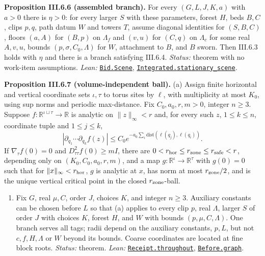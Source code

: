 \documentclass[
  letterpaper,
  11pt]{article}
\providecommand{\tightlist}{%
  \setlength{\itemsep}{0pt}\setlength{\parskip}{0pt}}
\begin{document}
\textbf{Proposition III.6.6 (assembled branch).} For every
\((G,L,J,K,a)\) with \(a>0\) there is \(\eta>0\): for every larger \(S\)
with these parameters, forest \(H\), beds \(B,C\), clips \(p,q\), path
datum \(W\) and towers \(T\), assume diagonal identities for
\((S,B,C)\), floors \((a,A)\) for \((B,p)\) on \(\Lambda_f\) and
\((v,u)\) for \((C,q)\) on \(\Lambda_c\) for some real \(A,v,u\), bounds
\((p,\sigma,C_0,\Lambda)\) for \(W\), attachment to \(B\), and \(B\)
sworn. Then III.6.3 holds with \(\eta\) and there is a branch satisfying
III.6.4. \emph{Status:} theorem with no work-item assumptions.
\emph{Lean:}
\href{https://github.com/yang-mills-group/OpenAI-YM-20261028/blob/3456e5e75cf8d4cd558955a5c7638fba2d68f464/YM/Bid/Station.lean\#L102-L106}{\texttt{Bid.Scene}},
\href{https://github.com/yang-mills-group/OpenAI-YM-20261028/blob/3456e5e75cf8d4cd558955a5c7638fba2d68f464/YM/Integrated.lean\#L229-L232}{\texttt{Integrated.stationary\_scene}}.

\textbf{Proposition III.6.7 (volume-independent ball).} (a) Assign
finite horizontal and vertical coordinate sets \(\iota,\tau\) to torus
sites by \(\ell\), with multiplicity at most \(K_0\), using sup norms
and periodic max-distance. Fix \(C_0,a_0,r,m>0\), integer \(n\ge3\).
Suppose \(f:\mathbb R^{\iota\sqcup\tau}\to\mathbb R\) is analytic on
\(\|z\|_\infty<r\) and, for every such \(z\), \(1\le k\le n\),
coordinate tuple and \(1\le j\le k\),
\[|\partial_{q_1}\cdots\partial_{q_k}f(z)|\le C_0e^{-a_0\sum_i\mathrm{dist}(\ell(q_j),\ell(q_i))}.\]
If \(\nabla_\tau f(0)=0\) and \(D^2_{\tau\tau}f(0)\ge mI\), there are
\(0<r_{\rm hor}\le r_{\rm zone}\le r_{\rm safe}<r\), depending only on
\((K_0,C_0,a_0,r,m)\), and a map \(g:\mathbb R^\iota\to\mathbb R^\tau\)
with \(g(0)=0\) such that for \(\|x\|_\infty<r_{\rm hor}\), \(g\) is
analytic at \(x\), has norm at most \(r_{\rm zone}/2\), and is the
unique vertical critical point in the closed \(r_{\rm zone}\)-ball.

\begin{enumerate}
\def\labelenumi{(\alph{enumi})}
\setcounter{enumi}{1}
\tightlist
\item
  Fix \(G\), real \(\mu,C\), order \(J\), choices \(K\), and integer
  \(n\ge3\). Auxiliary constants can be chosen before \(L\) so that (a)
  applies to every clip \(p\), real \(\Lambda\), larger \(S\) of order
  \(J\) with choices \(K\), forest \(H\), and \(W\) with bounds
  \((p,\mu,C,\Lambda)\). One branch serves all tags; radii depend on the
  auxiliary constants, \(p,L\), but not \(c,f,H,\Lambda\) or \(W\)
  beyond its bounds. Coarse coordinates are located at fine block roots.
  \emph{Status:} theorem. \emph{Lean:}
  \href{https://github.com/yang-mills-group/OpenAI-YM-20261028/blob/3456e5e75cf8d4cd558955a5c7638fba2d68f464/YM/Push/STATIONARY_UNIFORM/ImplicitRadius.lean\#L179-L215}{\texttt{Receipt.throughout}},
  \href{https://github.com/yang-mills-group/OpenAI-YM-20261028/blob/3456e5e75cf8d4cd558955a5c7638fba2d68f464/YM/Push/STATIONARY_UNIFORM/Paths.lean\#L253-L294}{\texttt{Before.graph}}.
\end{enumerate}
\end{document}
